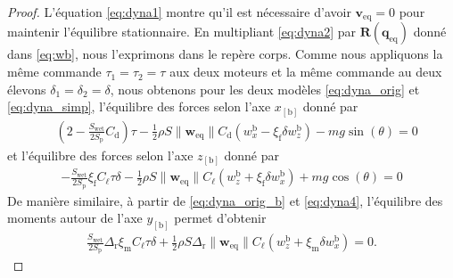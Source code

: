 \begin{proof}
        L'équation \eqref{eq:dyna1} montre qu'il est nécessaire d'avoir $\boldsymbol{v}_{\text{eq}} = 0$ pour maintenir l'équilibre stationnaire. En multipliant \eqref{eq:dyna2} par $\boldsymbol{R}(\boldsymbol{q}_{\text{eq}})$ donné dans  \eqref{eq:wb}, nous l'exprimons dans le repère corps.
        Comme nous appliquons la même commande $\tau_{1} = \tau_{2} = \tau $ aux deux moteurs et la même commande au deux élevons $\delta_{1} = \delta_{2} = \delta$, nous obtenons pour les deux modèles \eqref{eq:dyna_orig} et \eqref{eq:dyna_simp}, l'équilibre des forces selon l'axe $x_{[\text{b}]}$ donné par
        \begin{align}
            & (2-\frac{S_{\text{wet}}}{2S_{\text{p}}} C_{\text{d}})\tau - \frac{1}{2}\rho S \lVert \boldsymbol{w}_{\mathrm{eq}} \rVert C_{\text{d}} \left(w_{x}^{\text{b}} - \xi_{\text{f}} \delta w_{z}^{\text{b}} \right) - mg \sin(\theta) = 0 \label{eq:forcex}
        \end{align}
        et l'équilibre des forces selon l'axe $z_{[\text{b}]}$ donné par
        \begin{align}\label{eq:forcez}
            - \frac{S_{\text{wet}}}{2S_{\text{p}}}\xi_{\text{f}} C_{\ell} \tau \delta - \frac{1}{2}\rho S \lVert \boldsymbol{w}_{\mathrm{eq}} \rVert C_{\ell} \left(w_{z}^{\text{b}} + \xi_{\text{f}} \delta w_{x}^{\text{b}} \right) + mg \cos(\theta) = 0
        \end{align}
        De manière similaire, à partir de \eqref{eq:dyna_orig_b} et \eqref{eq:dyna4}, l'équilibre des moments autour de l'axe $y_{[\text{b}]}$ permet d'obtenir
        \begin{align}\label{eq:momenty}
            \frac{S_{\text{wet}}}{2S_{\text{p}}}  \Delta_{\text{r}} \xi_{\text{m}} C_{\ell} \tau \delta + \frac{1}{2}\rho S \Delta_{\text{r}} \lVert \boldsymbol{w}_{\mathrm{eq}} \rVert C_{\ell} \left(w_{z}^{\text{b}} + \xi_{\text{m}} \delta w_{x}^{\text{b}} \right) = 0.
        \end{align}
        

\end{proof}
